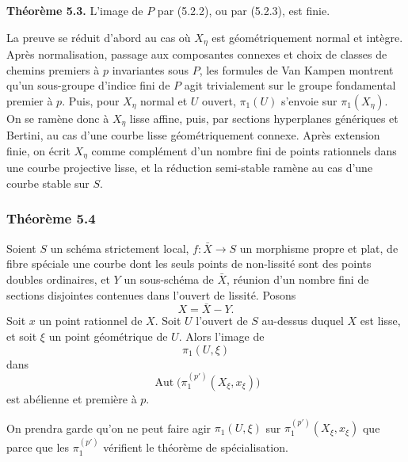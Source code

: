 \documentclass[11pt]{article}
\providecommand{\Aut}{\operatorname{Aut}}
\providecommand{\Hom}{\operatorname{Hom}}
\begin{document}
\textbf{Théorème 5.3.} L'image de $P$ par (5.2.2), ou par (5.2.3), est finie.

La preuve se réduit d'abord au cas où $X_\eta$ est géométriquement normal et intègre. Après normalisation, passage aux composantes connexes et choix de classes de chemins premiers à $p$ invariantes sous $P$, les formules de Van Kampen montrent qu'un sous-groupe d'indice fini de $P$ agit trivialement sur le groupe fondamental premier à $p$. Puis, pour $X_\eta$ normal et $U$ ouvert, $\pi_1(U)$ s'envoie sur $\pi_1(X_\eta)$. On se ramène donc à $X_\eta$ lisse affine, puis, par sections hyperplanes génériques et Bertini, au cas d'une courbe lisse géométriquement connexe. Après extension finie, on écrit $X_\eta$ comme complément d'un nombre fini de points rationnels dans une courbe projective lisse, et la réduction semi-stable ramène au cas d'une courbe stable sur $S$.



\providecommand{\cA}{\mathcal A}
\providecommand{\cV}{\mathcal V}
\providecommand{\cF}{\mathcal F}
\providecommand{\Hom}{\operatorname{Hom}}
\providecommand{\coker}{\operatorname{coker}}
\providecommand{\codim}{\operatorname{codim}}
\providecommand{\Coker}{\operatorname{Coker}}
\providecommand{\Picard}{\operatorname{Pic}}
\providecommand{\End}{\operatorname{End}}
\providecommand{\Prof}{\operatorname{prof}}
\providecommand{\Ima}{\operatorname{Im}}
\providecommand{\Frob}{\operatorname{Frob}}
\providecommand{\cQ}{\mathcal Q}
\providecommand{\Et}{\mathrm{et}}
\providecommand{\profp}{\widehat{\mathbb Z}^{(p')}}


\subsubsection*{Théorème 5.4}
Soient $S$ un schéma strictement local, $f:\bar X\to S$ un morphisme propre et plat, de fibre spéciale une courbe dont les seuls points de non-lissité sont des points doubles ordinaires, et $Y$ un sous-schéma de $\bar X$, réunion d'un nombre fini de sections disjointes contenues dans l'ouvert de lissité. Posons
\[
 X=\bar X-Y.
\]
Soit $x$ un point rationnel de $X$. Soit $U$ l'ouvert de $S$ au-dessus duquel $X$ est lisse, et soit $\xi$ un point géométrique de $U$. Alors l'image de
\[
 \pi_1(U,\xi)
\]
dans
\[
 \Aut\bigl(\pi_1^{(p')}(X_\xi,x_\xi)\bigr)
\]
est abélienne et première à $p$.

On prendra garde qu'on ne peut faire agir $\pi_1(U,\xi)$ sur $\pi_1^{(p')}(X_\xi,x_\xi)$ que parce que les $\pi_1^{(p')}$ vérifient le théorème de spécialisation.
\end{document}
